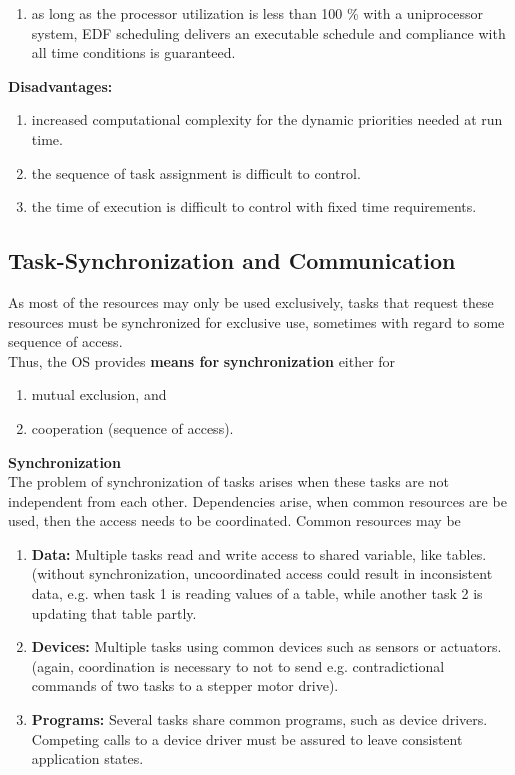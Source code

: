 \begin{enumerate}
\item  as long as the processor utilization is less than 100 \% with a uniprocessor system, EDF  scheduling delivers an executable schedule and compliance with all time conditions is guaranteed.
\end{enumerate}

\textbf{Disadvantages:}

\begin{enumerate}
\item \textbf{ }increased computational complexity for the dynamic priorities needed at run time.

\item  the sequence of task assignment is difficult to control.

\item  the time of execution is difficult to control with fixed time requirements.
\end{enumerate}

\subsection{  Task-Synchronization and Communication}

As most of the resources may only be used exclusively, tasks that request these resources must be synchronized for exclusive use, sometimes with regard to some sequence of access. \\

Thus, the OS provides \textbf{means for} \textbf{synchronization} either for 

\begin{enumerate}
\item  mutual exclusion, and 
\item  cooperation (sequence of access).
\end{enumerate}
\newpage
{\rot\bf Synchronization }\\

The problem of synchronization of tasks arises when these tasks are not independent from each other. Dependencies arise, when common resources are be used, then the access needs to be coordinated. Common resources may be

\begin{enumerate}
	\item  \textbf{Data: }Multiple tasks read and write access to shared variable, like tables. (without synchronization, uncoordinated access could result in inconsistent data, e.g. when task 1 is reading values of a table, while another task 2 is updating that table partly.

	\item  \textbf{Devices: } Multiple tasks using common devices such as sensors or actuators. (again, coordination is necessary to not to send e.g. contradictional commands of two tasks to a stepper motor drive).

	\item  \textbf{Programs: } Several tasks share common programs, such as device drivers. Competing calls to a device driver must be assured to leave consistent application states.
\end{enumerate}

